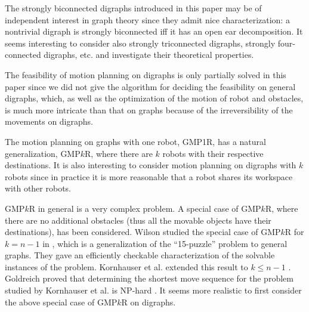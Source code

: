 \documentclass{article}
\begin{document}
The strongly biconnected digraphs introduced in this paper may be of
independent interest in graph theory since they admit nice
characterization: a nontrivial digraph is strongly biconnected iff
it has an open ear decomposition. It seems interesting to consider
also strongly triconnected digraphs, strongly four-connected
digraphs, etc. and investigate their theoretical properties.

The feasibility of motion planning on digraphs is only partially
solved in this paper since we did not give the algorithm for
deciding the feasibility on general digraphs, which, as well as the
optimization of the motion of robot and obstacles, is much more
intricate than that on graphs because of the irreversibility of the
movements on digraphs.

The motion planning on graphs with one robot, GMP1R, has a natural
generalization, GMP$k$R, where there are $k$ robots with their
respective destinations. It is also interesting to consider motion
planning on digraphs with $k$ robots since in practice it is more
reasonable that a robot shares its workspace with other robots.

GMP$k$R in general is a very complex problem. A special case of
GMP$k$R, where there are no additional obstacles (thus all the
movable objects have their destinations), has been considered.
Wilson studied the special case of GMP$k$R for $k=n-1$ in
\cite{Wilson74}, which is a generalization of the ``15-puzzle''
problem to general graphs. They gave an efficiently checkable
characterization of the solvable instances of the problem.
Kornhauser et al. extended this result to $k \le n-1$
\cite{KornhauserMS84}. Goldreich proved that determining the
shortest move sequence for the problem studied by Kornhauser et al.
is NP-hard \cite{Goldreich84}. It seems more realistic to first
consider the above special case of GMP$k$R on digraphs.


\end{document}
